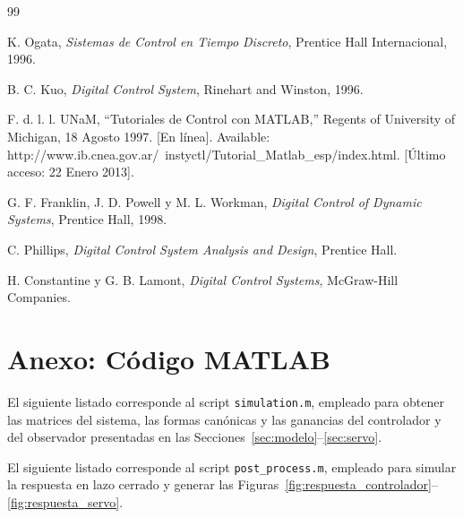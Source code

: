 \documentclass[conference]{IEEEtran}
\begin{document}

\begin{thebibliography}{99}

K. Ogata, \textit{Sistemas de Control en Tiempo Discreto}, Prentice Hall Internacional, 1996.

B. C. Kuo, \textit{Digital Control System}, Rinehart and Winston, 1996.

F. d. l. l. UNaM, ``Tutoriales de Control con MATLAB,'' Regents of University of Michigan, 18 Agosto 1997. [En línea]. Available: http://www.ib.cnea.gov.ar/~instyctl/Tutorial\_Matlab\_esp/index.html. [Último acceso: 22 Enero 2013].

G. F. Franklin, J. D. Powell y M. L. Workman, \textit{Digital Control of Dynamic Systems}, Prentice Hall, 1998.

C. Phillips, \textit{Digital Control System Analysis and Design}, Prentice Hall.

H. Constantine y G. B. Lamont, \textit{Digital Control Systems}, McGraw-Hill Companies.

\end{thebibliography}

\section*{Anexo: Código MATLAB}

El siguiente listado corresponde al script \texttt{simulation.m}, empleado para obtener las matrices del sistema, las formas canónicas y las ganancias del controlador y del observador presentadas en las Secciones~\ref{sec:modelo}--\ref{sec:servo}.



El siguiente listado corresponde al script \texttt{post\_process.m}, empleado para simular la respuesta en lazo cerrado y generar las Figuras~\ref{fig:respuesta_controlador}--\ref{fig:respuesta_servo}.


\end{document}
